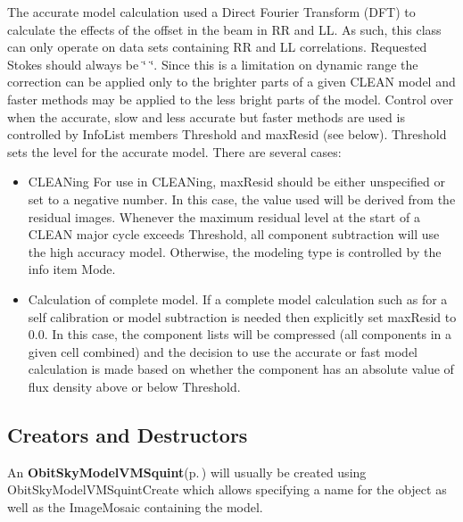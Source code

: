 The accurate model calculation used a Direct Fourier Transform (DFT) to calculate the effects of the offset in the beam in RR and LL. As such, this class can only operate on data sets containing RR and LL correlations. Requested Stokes should always be \char`\"{}    \char`\"{}. Since this is a limitation on dynamic range the correction can be applied only to the brighter parts of a given CLEAN model and faster methods may be applied to the less bright parts of the model. Control over when the accurate, slow and less accurate but faster methods are used is controlled by Info\-List members Threshold and max\-Resid (see below). Threshold sets the level for the accurate model. There are several cases: \begin{itemize}
\item CLEANing For use in CLEANing, max\-Resid should be either unspecified or set to a negative number. In this case, the value used will be derived from the residual images. Whenever the maximum residual level at the start of a CLEAN major cycle exceeds Threshold, all component subtraction will use the high accuracy model. Otherwise, the modeling type is controlled by the info item Mode. \item Calculation of complete model. If a complete model calculation such as for a self calibration or model subtraction is needed then explicitly set max\-Resid to 0.0. In this case, the component lists will be compressed (all components in a given cell combined) and the decision to use the accurate or fast model calculation is made based on whether the component has an absolute value of flux density above or below Threshold.\end{itemize}
\subsection{Creators and Destructors}\label{ObitSkyModelVMSquint_8h_ObitSkyModelVMSquintaccess}
An {\bf Obit\-Sky\-Model\-VMSquint}{\rm (p.\,\pageref{structObitSkyModelVMSquint})} will usually be created using Obit\-Sky\-Model\-VMSquint\-Create which allows specifying a name for the object as well as the Image\-Mosaic containing the model.

